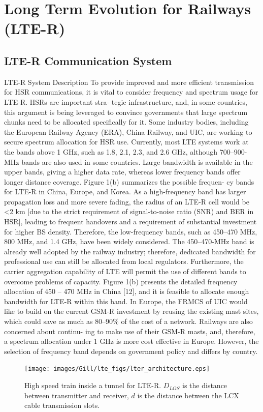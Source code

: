 \chapter{Long Term Evolution for Railways (LTE-R)}
\label{chapter3}

\section{LTE-R Communication System}
LTE-R System Description To provide improved and more efficient transmission for
HSR communications, it is vital to consider frequency and spectrum usage for LTE-R. HSRs are important stra-
tegic infrastructure, and, in some countries, this argument is being leveraged to convince governments that
large spectrum chunks need to be allocated specifically for it. Some industry bodies, including the European
Railway Agency (ERA), China Railway, and UIC, are working to secure spectrum allocation for HSR use. Currently,
most LTE systems work at the bands above 1 GHz, such as 1.8, 2.1, 2.3, and 2.6 GHz, although 700–900-MHz
bands are also used in some countries. Large bandwidth is available in the upper bands, giving a higher data rate,
whereas lower frequency bands offer longer distance coverage. Figure 1(b) summarizes the possible frequen-
cy bands for LTE-R in China, Europe, and Korea. As a high-frequency band has larger propagation loss and
more severe fading, the radius of an LTE-R cell would be <2 km [due to the strict requirement of signal-to-noise ratio (SNR) 
and BER in HSR], leading to frequent handovers and a requirement of substantial investment for higher BS density. Therefore, the low-frequency bands,
such as 450–470 MHz, 800 MHz, and 1.4 GHz, have been widely considered. The 450–470-MHz band is already
well adopted by the railway industry; therefore, dedicated bandwidth for professional use can still be allocated
from local regulators. Furthermore, the carrier aggregation capability of LTE will permit the use of different bands to overcome problems of capacity. Figure 1(b)
presents the detailed frequency allocation of 450 – 470  MHz in China [12], and it is feasible to allocate
enough bandwidth for LTE-R within this band. In Europe, the FRMCS of UIC would like to build on the current GSM-R investment by reusing the existing mast
sites, which could save as much as 80–90\% of the cost of a network. Railways are also concerned about continu-
ing to make use of their GSM-R masts, and, therefore, a spectrum allocation under 1 GHz is more cost effective
in Europe. However, the selection of frequency band depends on government policy and differs by country.
\begin{figure}[t]
\label{fig:ltearch}
\centering
\texttt{[image: images/Gill/lte\_figs/lter\_architecture.eps]} 
\caption{High speed train inside a tunnel for LTE-R. $D_{LOS}$ is the distance between transmitter and receiver, $d$ is the distance between the LCX cable transmission slots.}
\end{figure}


